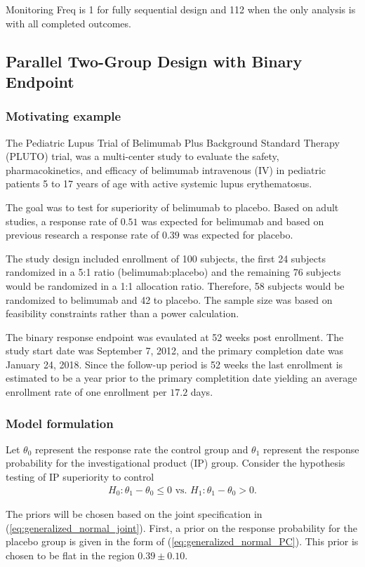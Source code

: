 \documentclass[12pt]{article}
\begin{document}
Monitoring Freq is 1 for fully sequential design and 112 when the only analysis is with all completed outcomes.
\subsection{Parallel Two-Group Design with Binary Endpoint}
\subsubsection{Motivating example}
The Pediatric Lupus Trial of Belimumab Plus Background Standard Therapy (PLUTO) trial, was a multi-center study to evaluate the safety, pharmacokinetics, and efficacy of belimumab intravenous (IV) in pediatric patients 5 to 17 years of age with active systemic lupus erythematosus. 

The goal was to test for superiority of belimumab to placebo. Based on adult studies, a response rate of $0.51$ was expected for belimumab and based on previous research a response rate of $0.39$ was expected for placebo.

The study design included enrollment of 100 subjects, the first 24 subjects randomized in a 5:1 ratio (belimumab:placebo) and the remaining 76 subjects would be randomized in a 1:1 allocation ratio. Therefore, 58 subjects would be randomized to belimumab and 42 to placebo. The sample size was based on feasibility constraints rather than a power calculation.

The binary response endpoint was evaulated at 52 weeks post enrollment. The study start date was September 7, 2012, and the primary completion date was January 24, 2018. Since the follow-up period is 52 weeks the last enrollment is estimated to be a year prior to the primary completition date yielding an average enrollment rate of one enrollment per $17.2$ days.
\subsubsection{Model formulation}
Let $\theta_0$ represent the response rate the control group and $\theta_1$ represent the response probability for the investigational product (IP) group. 
Consider the hypothesis testing of IP superiority to control
\begin{align*}
H_0:\theta_1-\theta_0\leq 0\text{ vs. }H_1: \theta_1-\theta_0>0.
\end{align*}

The priors will be chosen based on the joint specification in (\ref{eq:generalized_normal_joint}). First, a prior on the response probability for the placebo group is given in the form of (\ref{eq:generalized_normal_PC}). This prior is chosen to be flat in the region $0.39\pm 0.10$.
\end{document}
